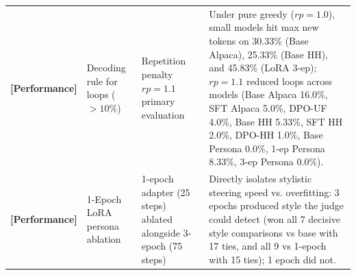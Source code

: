 \begin{table}[t]
\begin{tabularx}{\textwidth}{lp{3.4cm}p{4.2cm}X}
\textbf{[Performance]} & Decoding rule for loops ($>10\%$) & Repetition penalty $rp=1.1$ primary evaluation & Under pure greedy ($rp=1.0$), small models hit max new tokens on 30.33\% (Base Alpaca), 25.33\% (Base HH), and 45.83\% (LoRA 3-ep); $rp=1.1$ reduced loops across models (Base Alpaca 16.0\%, SFT Alpaca 5.0\%, DPO-UF 4.0\%, Base HH 5.33\%, SFT HH 2.0\%, DPO-HH 1.0\%, Base Persona 0.0\%, 1-ep Persona 8.33\%, 3-ep Persona 0.0\%). \\
\textbf{[Performance]} & 1-Epoch LoRA persona ablation & 1-epoch adapter (25 steps) ablated alongside 3-epoch (75 steps) & Directly isolates stylistic steering speed vs. overfitting: 3 epochs produced style the judge could detect (won all 7 decisive style comparisons vs base with 17 ties, and all 9 vs 1-epoch with 15 ties); 1 epoch did not. \\
\bottomrule
\end{tabularx}
\end{table}